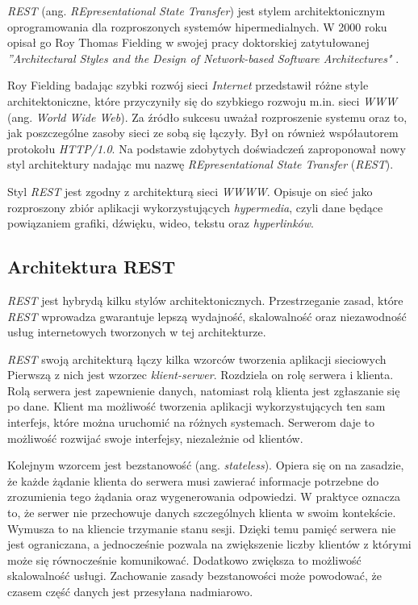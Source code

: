 \textsl{REST} (ang. \textsl{REpresentational State Transfer}) jest stylem architektonicznym oprogramowania dla rozproszonych systemów hipermedialnych. W 2000 roku opisał go Roy Thomas Fielding w swojej pracy doktorskiej zatytułowanej \textsl{''Architectural Styles and the Design of Network-based Software Architectures"} \cite{restinpractice}.

Roy Fielding badając  szybki rozwój sieci \textsl{Internet} przedstawił różne style architektoniczne, które przyczyniły się do szybkiego rozwoju m.in. sieci \textsl{WWW} (ang. \textsl{World Wide Web}). Za źródło sukcesu  uważał rozproszenie systemu oraz to, jak poszczególne zasoby sieci ze sobą się łączyły. Był on również współautorem protokołu \textsl{HTTP/1.0}. Na podstawie zdobytych doświadczeń zaproponował nowy styl  architektury nadając mu nazwę \textsl{REpresentational State Transfer} (\textsl{REST}).  

Styl \textsl{REST} jest  zgodny z architekturą sieci \textsl{WWWW}. Opisuje on sieć jako rozproszony zbiór aplikacji wykorzystujących \textsl{hypermedia}, czyli dane będące powiązaniem grafiki, dźwięku, wideo, tekstu oraz \textsl{hyperlinków}. 

\subsection{Architektura REST}
\textsl{REST} jest hybrydą kilku stylów architektonicznych. Przestrzeganie zasad, które \textsl{REST} wprowadza gwarantuje lepszą wydajność, skalowalność oraz niezawodność usług internetowych tworzonych w tej architekturze. 

\textsl{REST} swoją architekturą łączy kilka wzorców tworzenia aplikacji sieciowych
Pierwszą z nich jest wzorzec \textsl{klient-serwer}. Rozdziela on rolę serwera i klienta. Rolą serwera jest zapewnienie danych, natomiast rolą klienta jest zgłaszanie się po dane. Klient ma możliwość tworzenia aplikacji wykorzystujących ten sam interfejs, które można uruchomić na różnych systemach. Serwerom daje to możliwość rozwijać swoje interfejsy, niezależnie od klientów. 

Kolejnym wzorcem jest bezstanowość (ang. \textsl{stateless}). Opiera się on na zasadzie, że każde żądanie klienta do serwera musi zawierać informacje potrzebne do zrozumienia tego żądania oraz wygenerowania odpowiedzi. W praktyce oznacza to, że serwer nie przechowuje danych szczególnych klienta w swoim kontekście. Wymusza to na kliencie trzymanie stanu sesji. Dzięki temu pamięć serwera nie jest ograniczana, a jednocześnie pozwala na zwiększenie liczby klientów z którymi może się równocześnie komunikować. Dodatkowo zwiększa to możliwość skalowalność usługi. Zachowanie zasady bezstanowości może powodować, że czasem część danych jest przesyłana nadmiarowo.

